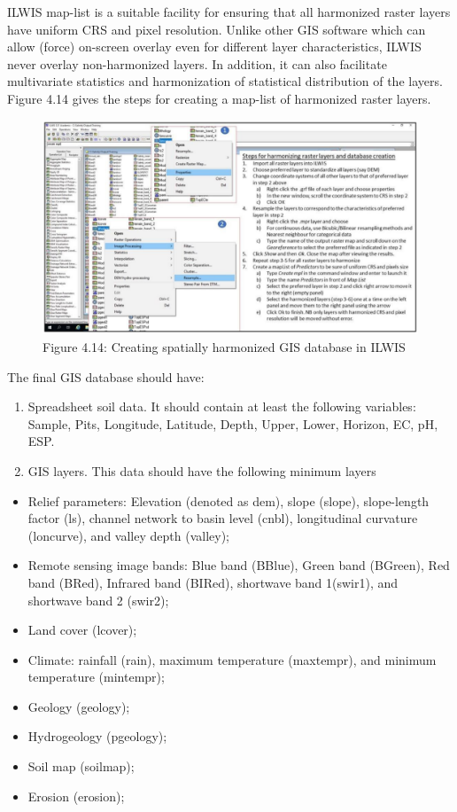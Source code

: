 \documentclass[
  10pt,
  b5paper,
]{book}
\providecommand{\tightlist}{%
  \setlength{\itemsep}{0pt}\setlength{\parskip}{0pt}}
\begin{document}
ILWIS map-list is a suitable facility for ensuring that all harmonized raster layers have uniform CRS and pixel resolution. Unlike other GIS software which can allow (force) on-screen overlay even for different layer characteristics, ILWIS never overlay non-harmonized layers. In addition, it can also facilitate multivariate statistics and harmonization of statistical distribution of the layers. Figure 4.14 gives the steps for creating a map-list of harmonized raster layers.

\begin{figure}
\centering
\includegraphics{figures/images/Figure4.14.PNG}
\caption{Figure 4.14: Creating spatially harmonized GIS database in ILWIS}
\end{figure}

The final GIS database should have:

\begin{enumerate}
\def\labelenumi{\arabic{enumi}.}
\tightlist
\item
  Spreadsheet soil data. It should contain at least the following variables: Sample, Pits, Longitude, Latitude, Depth, Upper, Lower, Horizon, EC, pH, ESP.
\item
  GIS layers. This data should have the following minimum layers
\end{enumerate}

\begin{itemize}
\tightlist
\item
  Relief parameters: Elevation (denoted as dem), slope (slope), slope-length factor (ls), channel network to basin level (cnbl), longitudinal curvature (loncurve), and valley depth (valley);
\item
  Remote sensing image bands: Blue band (BBlue), Green band (BGreen), Red band (BRed), Infrared band (BIRed), shortwave band 1(swir1), and shortwave band 2 (swir2);
\item
  Land cover (lcover);
\item
  Climate: rainfall (rain), maximum temperature (maxtempr), and minimum temperature (mintempr);
\item
  Geology (geology);
\item
  Hydrogeology (pgeology);
\item
  Soil map (soilmap);
\item
  Erosion (erosion);
\end{itemize}
\end{document}
